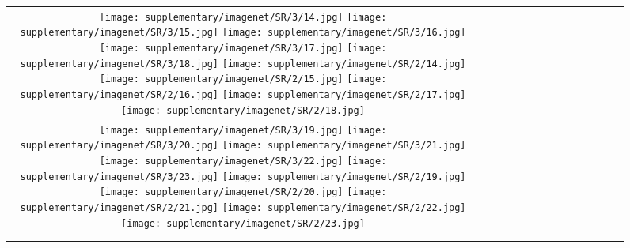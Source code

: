 \begin{figure*}[tb!]
{\begin{tabular}{c c c c c c c c c c c c c c }
\tabularnewline
  \texttt{[image: supplementary/imagenet/SR/3/14.jpg]}
  \texttt{[image: supplementary/imagenet/SR/3/15.jpg]}
  \texttt{[image: supplementary/imagenet/SR/3/16.jpg]}
  \texttt{[image: supplementary/imagenet/SR/3/17.jpg]}
  \texttt{[image: supplementary/imagenet/SR/3/18.jpg]}
    \hspace{5mm}
  \texttt{[image: supplementary/imagenet/SR/2/14.jpg]}
  \texttt{[image: supplementary/imagenet/SR/2/15.jpg]}
  \texttt{[image: supplementary/imagenet/SR/2/16.jpg]}
  \texttt{[image: supplementary/imagenet/SR/2/17.jpg]}
  \texttt{[image: supplementary/imagenet/SR/2/18.jpg]}

\tabularnewline
  \texttt{[image: supplementary/imagenet/SR/3/19.jpg]}
  \texttt{[image: supplementary/imagenet/SR/3/20.jpg]}
  \texttt{[image: supplementary/imagenet/SR/3/21.jpg]}
  \texttt{[image: supplementary/imagenet/SR/3/22.jpg]}
  \texttt{[image: supplementary/imagenet/SR/3/23.jpg]}
    \hspace{5mm}
  \texttt{[image: supplementary/imagenet/SR/2/19.jpg]}
  \texttt{[image: supplementary/imagenet/SR/2/20.jpg]}
  \texttt{[image: supplementary/imagenet/SR/2/21.jpg]}
  \texttt{[image: supplementary/imagenet/SR/2/22.jpg]}
  \texttt{[image: supplementary/imagenet/SR/2/23.jpg]}
    \tabularnewline

 \hspace{0.5mm}
  \tabularnewline
\vspace{2mm}
\vspace{-2\baselineskip}
\end{tabular}}
\vspace{-0.8cm}
\hspace{20pt}\label{fig:sup1b}
\vspace{-8mm}
\end{figure*}%